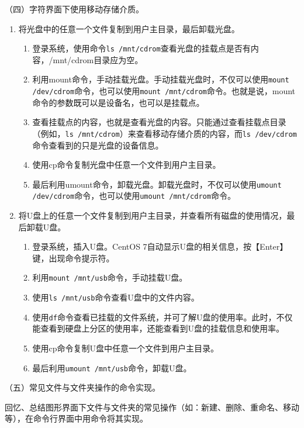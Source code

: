 \vspace{0.1in}
（四）字符界面下使用移动存储介质。
\begin{enumerate}
  \item 将光盘中的任意一个文件复制到用户主目录，最后卸载光盘。
    \begin{enumerate}
      \item 登录系统，使用命令\verb|ls /mnt/cdrom|查看光盘的挂载点是否有内容，/mnt/cdrom目录应为空。
      \item 利用mount命令，手动挂载光盘。手动挂载光盘时，不仅可以使用\verb|mount /dev/cdrom|命令，也可以使用\verb|mount /mnt/cdrom|命令。也就是说，mount命令的参数既可以是设备名，也可以是挂载点。
      \item 查看挂载点的内容，也就是查看光盘的内容。只能通过查看挂载点目录（例如，\verb|ls /mnt/cdrom|）来查看移动存储介质的内容，而\verb|ls /dev/cdrom|命令查看到的只是光盘的设备信息。
      \item 使用cp命令复制光盘中任意一个文件到用户主目录。
      \item 最后利用umount命令，卸载光盘。卸载光盘时，不仅可以使用\verb|umount /dev/cdrom|命令，也可以使用\verb|umount /mnt/cdrom|命令。
    \end{enumerate}
  \item 将U盘上的任意一个文件复制到用户主目录，并查看所有磁盘的使用情况，最后卸载U盘。
    \begin{enumerate}
      \item 登录系统，插入U盘。CentOS 7自动显示U盘的相关信息，按【Enter】键，出现命令提示符。
      \item 利用\verb|mount /mnt/usb|命令，手动挂载U盘。
      \item 使用\verb|ls /mnt/usb|命令查看U盘中的文件内容。
      \item 使用\verb|df|命令查看已挂载的文件系统，并可了解U盘的使用率。此时，不仅能查看到硬盘上分区的使用率，还能查看到U盘的挂载信息和使用率。
      \item 使用cp命令复制U盘中任意一个文件到用户主目录。
      \item 最后利用\verb|umount /mnt/usb|命令，卸载U盘。
    \end{enumerate}
\end{enumerate}

\vspace{0.1in}
（五）常见文件与文件夹操作的命令实现。

回忆、总结图形界面下文件与文件夹的常见操作（如：新建、删除、重命名、移动等），在命令行界面中用命令将其实现。
